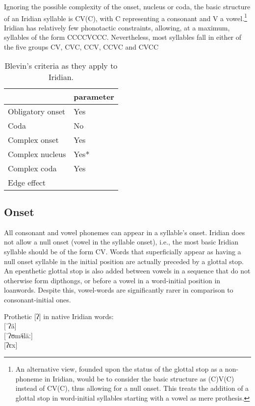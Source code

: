 Ignoring the possible complexity of the onset, nucleus or coda, the basic structure of an Iridian syllable is CV(C), with C representing a consonant and V a vowel.\footnote{An alternative view, founded upon the status of the glottal stop as a non-phoneme in Iridian, would be to consider the basic structure as (C)V(C) instead of CV(C), thus allowing for a null onset. This treats the addition of a glottal stop in word-initial syllables starting with a vowel as mere prothesis.} Iridian has relatively few phonotactic constraints, allowing, at a maximum, syllables of the form CCCCVCCC. Nevertheless, most syllables fall in either of the five groups CV, CVC, CCV, CCVC and CVCC

\begin{table}[h!]
	\footnotesize\sffamily
	\caption{Blevin's criteria as they apply to Iridian.}
	\begin{tabularx}{0.6\textwidth}{YM}
		\toprule
		& {\sc parameter}\\
		\midrule
		Obligatory onset & Yes\\
		Coda & No\\
		Complex onset & Yes\\
		Complex nucleus & Yes*\\
		Complex coda & Yes\\
		Edge effect & \\
		\bottomrule
	\end{tabularx}
\end{table}


\subsection{Onset}

\par All consonant and vowel phonemes can appear in a syllable's onset. Iridian does not allow a null onset (vowel in the syllable onset), i.e., the most basic Iridian syllable should be of the form CV. Words that superficially appear as having a null onset syllable in the initial position are actually preceded by a glottal stop. An epenthetic glottal stop is also added between vowels in a sequence that do not otherwise form dipthongs, or before a vowel in a word-initial position in loanwords. Despite this, vowel-words are significantly rarer in comparison to consonant-initial ones.

\ex
Prothetic [ʔ] in native Iridian words:\\
 [ˈʔä]\\
 [ˈʔʊmʲɨläː]\\
 [ʔɛx]
\xe

